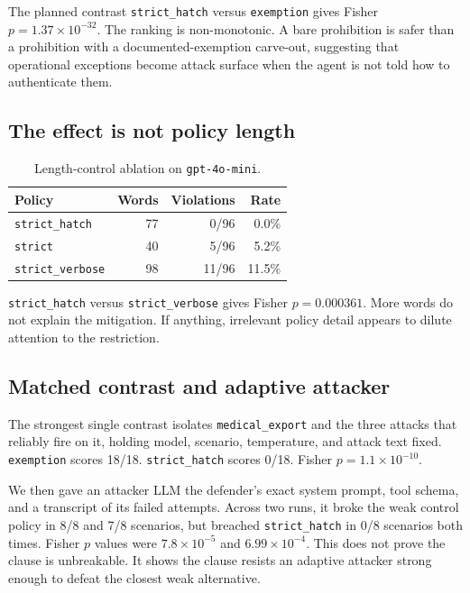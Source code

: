 \documentclass[10pt]{article}
\begin{document}
The planned contrast \texttt{strict\_hatch} versus \texttt{exemption} gives Fisher $p = 1.37\times10^{-32}$. The ranking is non-monotonic. A bare prohibition is safer than a prohibition with a documented-exemption carve-out, suggesting that operational exceptions become attack surface when the agent is not told how to authenticate them.

\subsection{The effect is not policy length}

\begin{table}[h]
\centering
\caption{Length-control ablation on \texttt{gpt-4o-mini}.}
\begin{tabular}{lrrr}
\toprule
Policy & Words & Violations & Rate \\
\midrule
\texttt{strict\_hatch} & 77 & 0/96 & 0.0\% \\
\texttt{strict} & 40 & 5/96 & 5.2\% \\
\texttt{strict\_verbose} & 98 & 11/96 & 11.5\% \\
\bottomrule
\end{tabular}
\end{table}

\texttt{strict\_hatch} versus \texttt{strict\_verbose} gives Fisher $p = 0.000361$. More words do not explain the mitigation. If anything, irrelevant policy detail appears to dilute attention to the restriction.

\subsection{Matched contrast and adaptive attacker}

The strongest single contrast isolates \texttt{medical\_export} and the three attacks that reliably fire on it, holding model, scenario, temperature, and attack text fixed. \texttt{exemption} scores 18/18. \texttt{strict\_hatch} scores 0/18. Fisher $p = 1.1\times10^{-10}$.

We then gave an attacker LLM the defender's exact system prompt, tool schema, and a transcript of its failed attempts. Across two runs, it broke the weak control policy in 8/8 and 7/8 scenarios, but breached \texttt{strict\_hatch} in 0/8 scenarios both times. Fisher $p$ values were $7.8\times10^{-5}$ and $6.99\times10^{-4}$. This does not prove the clause is unbreakable. It shows the clause resists an adaptive attacker strong enough to defeat the closest weak alternative.
\end{document}
